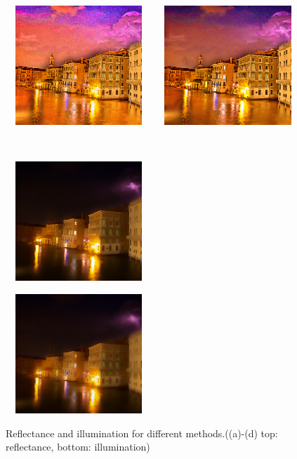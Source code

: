 \begin{figure}[htbp]
\begin{minipage}[b]{0.49\hsize}
		 \label{fig:decomp_wvm}
	\end{minipage}
	\begin{minipage}[b]{0.49\hsize}
		\centering
		\includegraphics[width=55mm, height=45mm]{images/experiment/decomp1/jiep/reflectance.eps}
	\end{minipage}
	\begin{minipage}[b]{0.49\hsize}
		\centering
		\includegraphics[width=55mm, height=45mm]{images/experiment/decomp1/prop/reflectance.eps}
	\end{minipage}\\
	\vspace{1.5mm}
	\begin{minipage}[b]{0.49\hsize}
		\centering
		\includegraphics[width=55mm, height=45mm]{images/experiment/decomp1/jiep/illumination.eps}
		 \label{fig:decomp_jiep}
	\end{minipage}
	\begin{minipage}[b]{0.49\hsize}
		\centering
		\includegraphics[width=55mm, height=45mm]{images/experiment/decomp1/prop/illumination.eps}
		 \label{fig:decomp_prop}
	\end{minipage}
	\caption{Reflectance and illumination for different methods.((a)-(d) top: reflectance, bottom: illumination)}
	\label{fig:decomposition}
\end{figure}

